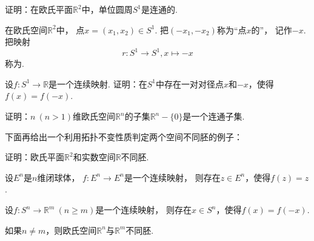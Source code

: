 
\begin{example}
证明：在欧氏平面\(\mathbb{R}^2\)中，单位圆周\(S^1\)是连通的.
\end{example}

\begin{definition}
在欧氏空间\(\mathbb{R}^2\)中，
点\(x=(x_1,x_2) \in S^1\).
把\((-x_1,-x_2)\)称为“点\(x\)的”，
记作\(-x\).
把映射\begin{equation*}
	r\colon S^1 \to S^1, x \mapsto -x
\end{equation*}
称为.
\end{definition}

\begin{example}\label{example:连通空间.从单位圆周到实数域的连续映射在一对对径点的值相等}
设\(f\colon S^1 \to \mathbb{R}\)是一个连续映射.
证明：在\(S^1\)中存在一对对径点\(x\)和\(-x\)，使得\(f(x) = f(-x)\).
\end{example}

\begin{example}
证明：\(n\ (n>1)\)维欧氏空间\(\mathbb{R}^n\)的子集\(\mathbb{R}^n-\{0\}\)是一个连通子集.
\end{example}

下面再给出一个利用拓扑不变性质判定两个空间不同胚的例子：
\begin{example}
证明：欧氏平面\(\mathbb{R}^2\)和实数空间\(\mathbb{R}\)不同胚.
\end{example}


\begin{theorem}
设\(E^n\)是\(n\)维闭球体，
\(f\colon E^n \to E^n\)是一个连续映射，
则存在\(z \in E^n\)，使得\(f(z) = z\).
\end{theorem}

\begin{theorem}
设\(f\colon S^n \to \mathbb{R}^m\ (n \geq m)\)是一个连续映射，
则存在\(x \in S^n\)，使得\(f(x) = f(-x)\).
\end{theorem}

\begin{theorem}
如果\(n \neq m\)，则欧氏空间\(\mathbb{R}^n\)与\(\mathbb{R}^m\)不同胚.
\end{theorem}
